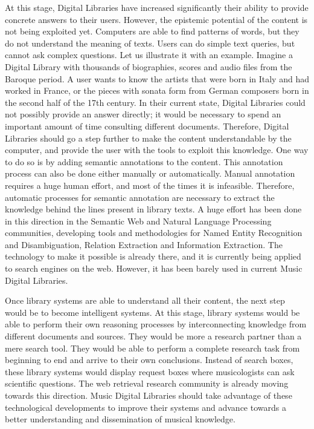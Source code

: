 At this stage, Digital Libraries have increased significantly their ability to provide concrete answers to their users. However, the epistemic potential of the content is not being exploited yet. Computers are able to find patterns of words, but they do not understand the meaning of texts. Users can do simple text queries, but cannot ask complex questions. Let us illustrate it with an example. Imagine a Digital Library with thousands of biographies, scores and audio files from the Baroque period. A user wants to know the artists that were born in Italy and had worked in France, or the pieces with sonata form from German composers born in the second half of the 17th century. In their current state, Digital Libraries could not possibly provide an answer directly; it would be necessary to spend an important amount of time consulting different documents. Therefore, Digital Libraries should go a step further to make the content understandable by the computer, and provide the user with the tools to exploit this knowledge. One way to do so is by adding semantic annotations to the content. This annotation process can also be done either manually or automatically. Manual annotation requires a huge human effort, and most of the times it is infeasible. Therefore, automatic processes for semantic annotation are necessary to extract the knowledge behind the lines present in library texts. A huge effort has been done in this direction in the Semantic Web and Natural Language Processing communities, developing tools and methodologies for Named Entity Recognition and Disambiguation, Relation Extraction and Information Extraction. The technology to make it possible is already there, and it is currently being applied to search engines on the web. However, it has been barely used in current Music Digital Libraries.

Once library systems are able to understand all their content, the next step would be to become intelligent systems. At this stage, library systems would be able to perform their own reasoning processes by interconnecting knowledge from different documents and sources. They would be more a research partner than a mere search tool. They would be able to perform a complete research task from beginning to end and arrive to their own conclusions. Instead of search boxes, these library systems would display request boxes where musicologists can ask scientific questions. The web retrieval research community is already moving towards this direction. Music Digital Libraries should take advantage of these technological developments to improve their systems and advance towards a better understanding and dissemination of musical knowledge.

